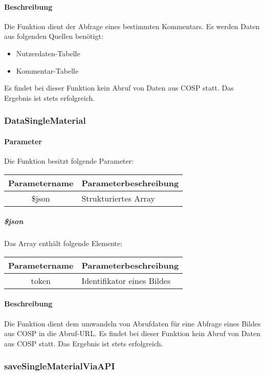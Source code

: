 \paragraph{Beschreibung} Die Funktion dient der Abfrage eines bestimmten Kommentars. Es werden Daten aus folgenden Quellen benötigt:
\begin{itemize}
	\item Nutzerdaten-Tabelle
	\item Kommentar-Tabelle
\end{itemize}
Es findet bei dieser Funktion kein Abruf von Daten aus {\glqq COSP\grqq} statt. Das Ergebnis ist stets erfolgreich.
\subsubsection{DataSingleMaterial}
\paragraph{Parameter} Die Funktion besitzt folgende Parameter:
\begin{table}[H]
	\begin{tabular}{|c|p{11cm}|}
		\hline
		\textbf{Parametername} & \textbf{Parameterbeschreibung} \\ \hline
		\$json & Strukturiertes Array \\ \hline
	\end{tabular}
\end{table}
\subparagraph{\$json}Das Array enthält folgende Elemente:
\begin{table}[H]
	\begin{tabular}{|c|p{11cm}|}
		\hline
		\textbf{Parametername} & \textbf{Parameterbeschreibung} \\ \hline
		token & Identifikator eines Bildes \\ \hline
	\end{tabular}
\end{table}
\paragraph{Beschreibung} Die Funktion dient dem umwandeln von Abrufdaten für eine Abfrage eines Bildes aus {\glqq COSP\grqq} in die Abruf-URL. Es findet bei dieser Funktion kein Abruf von Daten aus {\glqq COSP\grqq} statt. Das Ergebnis ist stets erfolgreich.
\subsubsection{saveSingleMaterialViaAPI}
